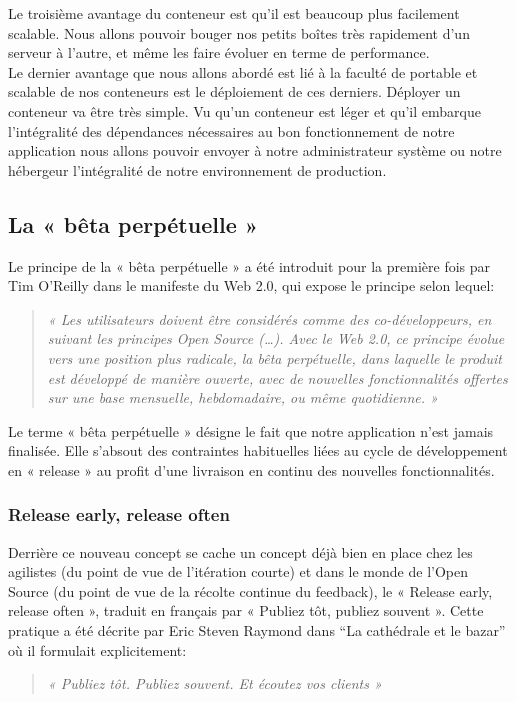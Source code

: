 \documentclass{report}
\begin{document}
        Le troisième avantage du conteneur est qu’il est beaucoup plus facilement scalable. Nous allons pouvoir bouger nos petits boîtes très rapidement d’un serveur à l’autre, et même les faire évoluer en terme de performance.\\

        Le dernier avantage que nous allons abordé est lié à la faculté de portable et scalable de nos conteneurs est le déploiement de ces derniers. Déployer un conteneur va être très simple. Vu qu’un conteneur est léger et qu’il embarque l’intégralité des dépendances nécessaires au bon fonctionnement de notre application nous allons pouvoir envoyer à notre administrateur système ou notre hébergeur l’intégralité de notre environnement de production.

      \subsection{La « bêta perpétuelle »}
      Le principe de la « bêta perpétuelle » a été introduit pour la première fois par Tim O’Reilly dans le manifeste du Web 2.0, qui expose le principe selon lequel:\\
      \begin{quotation}
        \emph{« Les utilisateurs doivent être considérés comme des co-développeurs, en suivant les principes Open Source (…). Avec le Web 2.0, ce principe évolue vers une position plus radicale, la bêta perpétuelle, dans laquelle le produit est développé de manière ouverte, avec de nouvelles fonctionnalités offertes sur une base mensuelle, hebdomadaire, ou même quotidienne. »}\\
      \end{quotation}

      Le terme « bêta perpétuelle » désigne le fait que notre application n’est jamais finalisée. Elle s’absout des contraintes habituelles liées au cycle de développement en « release » au profit d’une livraison en continu des nouvelles fonctionnalités.

        \subsubsection{Release early, release often}
        Derrière ce nouveau concept se cache un concept déjà bien en place chez les agilistes (du point de vue de l’itération courte) et dans le monde de l’Open Source (du point de vue de la récolte continue du feedback), le « Release early, release often », traduit en français par « Publiez tôt, publiez souvent ». Cette pratique a été décrite par Eric Steven Raymond dans “La cathédrale et le bazar” où il formulait explicitement:\\
        \begin{quotation}
          \emph{« Publiez tôt. Publiez souvent. Et écoutez vos clients »}\\
        \end{quotation}
\end{document}
